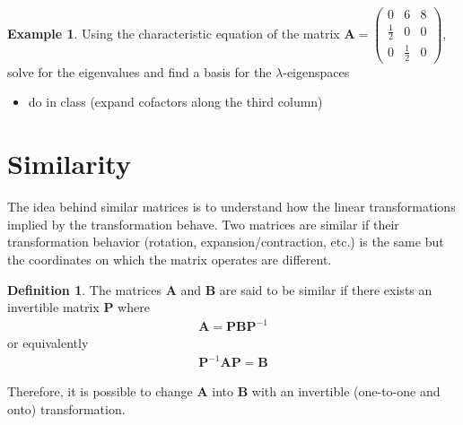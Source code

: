 \documentclass[
]{book}
\providecommand{\tightlist}{%
  \setlength{\itemsep}{0pt}\setlength{\parskip}{0pt}}
\theoremstyle{definition}
\newtheorem{definition}{Definition}[chapter]
\theoremstyle{definition}
\newtheorem{example}{Example}[chapter]
\theoremstyle{definition}
\theoremstyle{definition}
\theoremstyle{remark}
\begin{document}
\begin{example}

Using the characteristic equation of the matrix \(\mathbf{A} = \begin{pmatrix} 0 & 6 & 8 \\ \frac{1}{2} & 0 & 0 \\ 0 & \frac{1}{2} & 0 \end{pmatrix}\), solve for the eigenvalues and find a basis for the \(\lambda\)-eigenspaces

\begin{itemize}
\tightlist
\item
  do in class (expand cofactors along the third column)
\end{itemize}

\end{example}

\hypertarget{similarity}{%
\section{Similarity}\label{similarity}}

The idea behind similar matrices is to understand how the linear transformations implied by the transformation behave. Two matrices are similar if their transformation behavior (rotation, expansion/contraction, etc.) is the same but the coordinates on which the matrix operates are different.

\begin{definition}
The matrices \(\mathbf{A}\) and \(\mathbf{B}\) are said to be similar if there exists an invertible matrix \(\mathbf{P}\) where
\[
\begin{aligned}
\mathbf{A} = \mathbf{P} \mathbf{B} \mathbf{P}^{-1}
\end{aligned}
\]
or equivalently
\[
\begin{aligned}
\mathbf{P}^{-1} \mathbf{A} \mathbf{P}=  \mathbf{B} 
\end{aligned}
\]
\end{definition}

Therefore, it is possible to change \(\mathbf{A}\) into \(\mathbf{B}\) with an invertible (one-to-one and onto) transformation.
\end{document}
